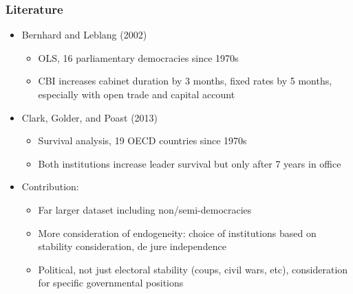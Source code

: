 \documentclass{beamer}
\begin{document}
    \begin{frame}
        \frametitle{Literature}
        \begin{itemize}
            \item Bernhard and Leblang (2002)
            \begin{itemize}
                \item OLS, 16 parliamentary democracies since 1970s
                \item CBI increases cabinet duration by 3 months, fixed rates by 5 months, especially with open trade and capital account
            \end{itemize}
            \item Clark, Golder, and Poast (2013)
            \begin{itemize}
                \item Survival analysis, 19 OECD countries since 1970s
                \item Both institutions increase leader survival but only after 7 years in office
            \end{itemize}
            \item Contribution:
            \begin{itemize}
                \item Far larger dataset including non/semi-democracies
                \item More consideration of endogeneity: choice of institutions based on stability consideration, de jure independence
                \item Political, not just electoral stability (coups, civil wars, etc), consideration for specific governmental positions
            \end{itemize}
        \end{itemize}
    \end{frame}
\end{document}
